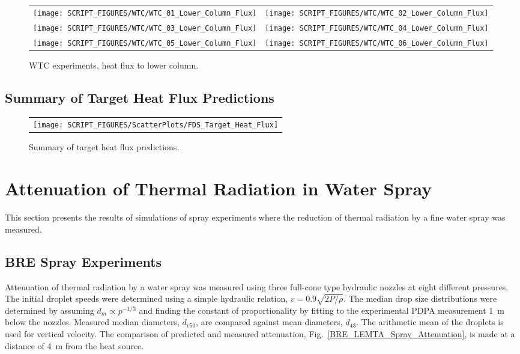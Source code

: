 \begin{figure}[p]
\begin{tabular*}{\textwidth}{l@{\extracolsep{\fill}}r}
\texttt{[image: SCRIPT\_FIGURES/WTC/WTC\_01\_Lower\_Column\_Flux]} &
\texttt{[image: SCRIPT\_FIGURES/WTC/WTC\_02\_Lower\_Column\_Flux]} \\
\texttt{[image: SCRIPT\_FIGURES/WTC/WTC\_03\_Lower\_Column\_Flux]} &
\texttt{[image: SCRIPT\_FIGURES/WTC/WTC\_04\_Lower\_Column\_Flux]} \\
\texttt{[image: SCRIPT\_FIGURES/WTC/WTC\_05\_Lower\_Column\_Flux]} &
\texttt{[image: SCRIPT\_FIGURES/WTC/WTC\_06\_Lower\_Column\_Flux]}
\end{tabular*}
\caption[WTC experiments, heat flux to lower column]
{WTC experiments, heat flux to lower column.}
\label{NIST_WTC_Lower_Column_Flux}
\end{figure}

\clearpage


\subsection{Summary of Target Heat Flux Predictions}
\label{Target Heat Flux}

\begin{figure}[h!]
\begin{center}
\begin{tabular}{c}
\texttt{[image: SCRIPT\_FIGURES/ScatterPlots/FDS\_Target\_Heat\_Flux]}
\end{tabular}
\end{center}
\caption[Summary of target heat flux predictions]
{Summary of target heat flux predictions.}
\end{figure}




\clearpage

\section{Attenuation of Thermal Radiation in Water Spray}

This section presents the results of simulations of spray experiments where the reduction of thermal radiation by a fine water spray was measured.

\subsection{BRE Spray Experiments}

Attenuation of thermal radiation by a water spray was measured using three full-cone type hydraulic nozzles at eight different pressures. The initial droplet speeds were determined using a simple hydraulic relation, $v = 0.9 \sqrt{2P/\rho}$. The median drop size distributions were determined by assuming $d_m \propto p^{-1/3}$ and finding the constant of proportionality by fitting to the experimental PDPA measurement 1~m below the nozzles.  Measured median diameters, $d_{v50}$, are compared against mean diameters, $d_{43}$. The arithmetic mean of the droplets is used for vertical velocity. The comparison of predicted and measured attenuation, Fig.~\ref{BRE_LEMTA_Spray_Attenuation}, is made at a distance of 4~m from the heat source.

